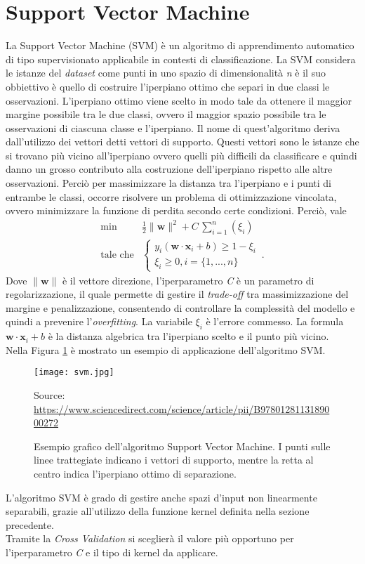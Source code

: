 \section{Support Vector Machine}
La Support Vector Machine (SVM) \autocite{GHOLAMI2017515} è un algoritmo di apprendimento automatico di tipo supervisionato applicabile in contesti di classificazione. La SVM considera le istanze del \emph{dataset} come punti in uno spazio di dimensionalità \emph{n} è il suo obbiettivo è quello di costruire l'iperpiano ottimo che separi in due classi le osservazioni. L'iperpiano ottimo viene scelto in modo tale da ottenere il maggior margine possibile tra le due classi, ovvero il maggior spazio possibile tra le osservazioni di ciascuna classe e l'iperpiano. Il nome di quest'algoritmo deriva dall'utilizzo dei vettori detti vettori di supporto. Questi vettori sono le istanze che si trovano più vicino all'iperpiano ovvero quelli più difficili da classificare e quindi danno un grosso contributo alla costruzione dell'iperpiano rispetto alle altre osservazioni. Perciò per massimizzare la distanza tra l'iperpiano e i punti di entrambe le classi, occorre risolvere un problema di ottimizzazione vincolata, ovvero minimizzare la funzione di perdita secondo certe condizioni. Perciò, vale 
\begin{align*}
	\text{min} & \frac{1}{2} \|\mathbf{w}\|^2 + C \, \sum_{i=1}^{n} (\xi_i) \\
	\text{tale che} & 
	\begin{cases}
		y_i(\mathbf{w \cdot x}_i + b) \geq  1 - \xi_i \\
		\xi_i \geq 0, i=\{1,...,n\}
	\end{cases} \, .
\end{align*}
Dove $\|\mathbf{w}\|$ è il vettore direzione, l'iperparametro \emph{C} è un parametro di regolarizzazione, il quale permette di gestire il \emph{trade-off} tra massimizzazione del margine e penalizzazione, consentendo di controllare la complessità del modello e quindi a prevenire l'\emph{overfitting}. La variabile $\xi_i$ è l'errore commesso. La formula $\mathbf{w \cdot x}_i + b$ è la distanza algebrica tra l'iperpiano scelto e il punto più vicino.\\
Nella Figura \ref{fig:svm} è mostrato un esempio di applicazione dell'algoritmo SVM.
\begin{figure}[h]
	\begin{center}
		\texttt{[image: svm.jpg]}
		\caption{Esempio grafico dell'algoritmo Support Vector Machine. I punti sulle linee trattegiate indicano i vettori di supporto, mentre la retta al centro indica l'iperpiano ottimo di separazione.
		} 
		Source: \url{https://www.sciencedirect.com/science/article/pii/B9780128113189000272}\label{fig:svm}
	\end{center}
\end{figure}
L'algoritmo SVM è grado di gestire anche spazi d'input non linearmente separabili, grazie all'utilizzo della funzione kernel definita nella sezione precedente.\\
Tramite la \emph{Cross Validation} si sceglierà il valore più opportuno per l'iperparametro \emph{C} e il tipo di kernel da applicare.

